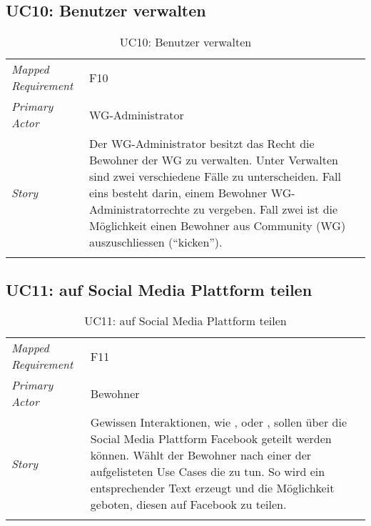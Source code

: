 \subsection{UC10: Benutzer verwalten}\label{subsec:uc10}
\begin{table}[H]
	\tablestyle
	\tablealtcolored
	\begin{tabularx}{\textwidth}{lX}
		\tablebody
			\textit{Mapped Requirement} &
			F10
			\tabularnewline
			\textit{Primary Actor} &
			WG-Administrator
			\tabularnewline
			\textit{Story} &
			Der WG-Administrator besitzt das Recht die Bewohner der WG zu verwalten. Unter Verwalten sind zwei verschiedene Fälle zu unterscheiden. Fall eins besteht darin, einem Bewohner WG-Administratorrechte zu vergeben. Fall zwei ist die Möglichkeit einen Bewohner aus Community (WG) auszuschliessen (``kicken'').
			\tabularnewline
		\tableend
	\end{tabularx}
	\caption{UC10: Benutzer verwalten}
\end{table}


\subsection{UC11: auf Social Media Plattform teilen}\label{subsec:uc11}
\begin{table}[H]
	\tablestyle
	\tablealtcolored
	\begin{tabularx}{\textwidth}{lX}
		\tablebody
			\textit{Mapped Requirement} &
			F11
			\tabularnewline
			\textit{Primary Actor} &
			Bewohner
			\tabularnewline
			\textit{Story} &
			Gewissen Interaktionen, wie \nameref{subsec:uc3}, \nameref{subsec:uc7} oder \nameref{subsec:uc8}, sollen über die Social Media Plattform Facebook geteilt werden können. Wählt der Bewohner nach einer der aufgelisteten Use Cases die zu tun. So wird ein entsprechender Text erzeugt und die Möglichkeit geboten, diesen auf Facebook zu teilen.
			\tabularnewline
		\tableend
	\end{tabularx}
	\caption{UC11: auf Social Media Plattform teilen}
\end{table}
